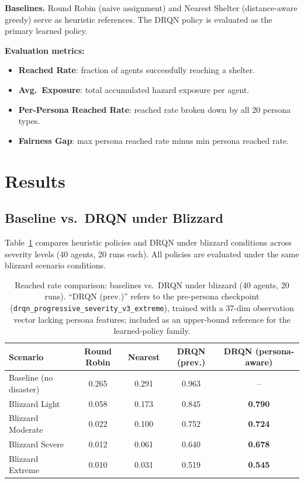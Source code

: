 \documentclass[11pt]{article}
\begin{document}
\textbf{Baselines.} Round Robin (naive assignment) and Nearest Shelter (distance-aware greedy) serve as heuristic references. The DRQN policy is evaluated as the primary learned policy.

\textbf{Evaluation metrics:}
\begin{itemize}
  \item \textbf{Reached Rate}: fraction of agents successfully reaching a shelter.
  \item \textbf{Avg.\ Exposure}: total accumulated hazard exposure per agent.
  \item \textbf{Per-Persona Reached Rate}: reached rate broken down by all 20 persona types.
  \item \textbf{Fairness Gap}: max persona reached rate minus min persona reached rate.
\end{itemize}

\section{Results}

\subsection{Baseline vs.\ DRQN under Blizzard}

Table~\ref{tab:baseline_vs_drqn} compares heuristic policies and DRQN under blizzard conditions across severity levels (40 agents, 20 runs each). All policies are evaluated under the same blizzard scenario conditions.

\begin{table}[h]
\centering
\caption{Reached rate comparison: baselines vs.\ DRQN under blizzard (40 agents, 20 runs). ``DRQN (prev.)'' refers to the pre-persona checkpoint (\texttt{drqn\_progressive\_severity\_v3\_extreme}), trained with a 37-dim observation vector lacking persona features; included as an upper-bound reference for the learned-policy family.}
\label{tab:baseline_vs_drqn}
\begin{tabular}{lcccc}
\toprule
\textbf{Scenario} & \textbf{Round Robin} & \textbf{Nearest} & \textbf{DRQN (prev.)} & \textbf{DRQN (persona-aware)} \\
\midrule
Baseline (no disaster) & 0.265 & 0.291 & 0.963 & -- \\
Blizzard Light    & 0.058 & 0.173 & 0.845 & \textbf{0.790} \\
Blizzard Moderate & 0.022 & 0.100 & 0.752 & \textbf{0.724} \\
Blizzard Severe   & 0.012 & 0.061 & 0.640 & \textbf{0.678} \\
Blizzard Extreme  & 0.010 & 0.031 & 0.519 & \textbf{0.545} \\
\bottomrule
\end{tabular}
\end{table}
\end{document}
